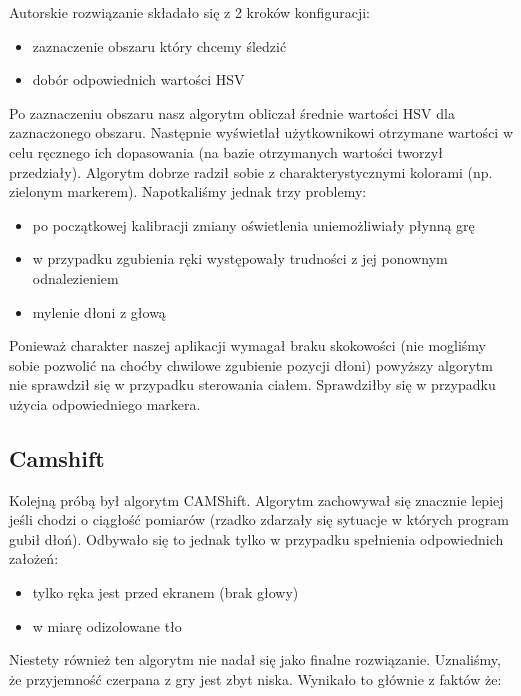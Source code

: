 \documentclass{article}
\newenvironment{tightlist}{
\begin{itemize}
  \setlength{\itemsep}{1pt}
  \setlength{\parskip}{0pt}
  \setlength{\parsep}{0pt}}
{\end{itemize}}
\begin{document}
Autorskie rozwiązanie składało się z 2 kroków konfiguracji:

\begin{tightlist}
\item zaznaczenie obszaru który chcemy śledzić
\item dobór odpowiednich wartości HSV
\end{tightlist}

Po zaznaczeniu obszaru nasz algorytm obliczał średnie wartości HSV dla zaznaczonego obszaru. Następnie wyświetlał użytkownikowi otrzymane wartości w celu ręcznego ich dopasowania (na bazie otrzymanych wartości tworzył przedziały). Algorytm dobrze radził sobie z charakterystycznymi kolorami (np. zielonym markerem). Napotkaliśmy jednak trzy problemy:

\begin{tightlist}
\item po początkowej kalibracji zmiany oświetlenia uniemożliwiały płynną grę
\item w przypadku zgubienia ręki występowały trudności z jej ponownym odnalezieniem
\item mylenie dłoni z głową
\end{tightlist}

Ponieważ charakter naszej aplikacji wymagał braku skokowości (nie mogliśmy sobie pozwolić na choćby chwilowe zgubienie pozycji dłoni) powyższy algorytm nie sprawdził się w przypadku sterowania ciałem. Sprawdziłby się w przypadku użycia odpowiedniego markera.

\subsection{Camshift}

Kolejną próbą był algorytm CAMShift. Algorytm zachowywał się znacznie lepiej jeśli chodzi o ciągłość pomiarów (rzadko zdarzały się sytuacje w których program gubił dłoń). Odbywało się to jednak tylko w przypadku spełnienia odpowiednich założeń:

\begin{tightlist}
\item{ tylko ręka jest przed ekranem (brak głowy) }
\item{ w miarę odizolowane tło}
\end{tightlist}

Niestety również ten algorytm nie nadał się jako finalne rozwiązanie. Uznaliśmy, że przyjemność czerpana z gry jest zbyt niska. Wynikało to głównie z faktów że:
\end{document}
